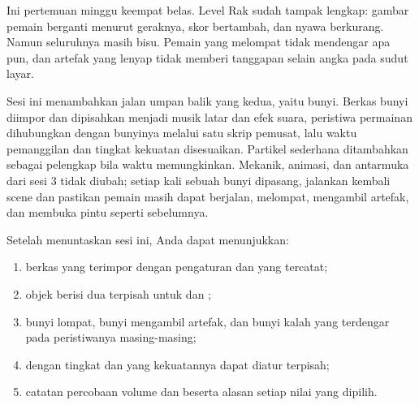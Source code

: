 

Ini pertemuan minggu keempat belas. Level Rak sudah tampak lengkap: gambar
pemain berganti menurut geraknya, skor bertambah, dan nyawa berkurang.
Namun seluruhnya masih bisu. Pemain yang melompat tidak mendengar apa pun,
dan artefak yang lenyap tidak memberi tanggapan selain angka pada sudut layar.

Sesi ini menambahkan jalan umpan balik yang kedua, yaitu bunyi. Berkas bunyi
diimpor dan dipisahkan menjadi musik latar dan efek suara, peristiwa permainan
dihubungkan dengan bunyinya melalui satu skrip pemusat, lalu waktu pemanggilan
dan tingkat kekuatan disesuaikan. Partikel sederhana ditambahkan sebagai
pelengkap bila waktu memungkinkan. Mekanik, animasi, dan antarmuka dari sesi 3
tidak diubah; setiap kali sebuah bunyi dipasang, jalankan kembali scene dan
pastikan pemain masih dapat berjalan, melompat, mengambil artefak, dan membuka
pintu seperti sebelumnya.


\begin{tujuanbox}
Setelah menuntaskan sesi ini, Anda dapat menunjukkan:
\begin{enumerate}[leftmargin=1.5em, itemsep=0.2em]
  \item berkas  yang terimpor dengan pengaturan
         dan  yang tercatat;
  \item objek  berisi dua  terpisah
        untuk  dan ;
  \item bunyi lompat, bunyi mengambil artefak, dan bunyi kalah yang terdengar
        pada peristiwanya masing-masing;
  \item {} dengan tingkat  dan  yang
        kekuatannya dapat diatur terpisah;
  \item catatan percobaan volume dan  beserta alasan setiap
        nilai yang dipilih.
\end{enumerate}
\end{tujuanbox}


